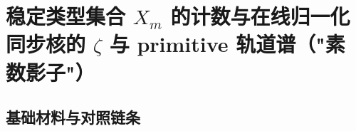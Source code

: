 \section{稳定类型集合 \texorpdfstring{$X_m$}{X\_m} 的计数与在线归一化同步核的 \texorpdfstring{$\zeta$}{zeta} 与 primitive 轨道谱（"素数影子"）}
\label{app:sync-kernel}



\subsection{基础材料与对照链条}







